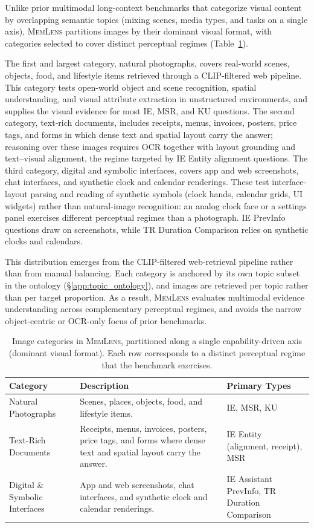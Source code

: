 \documentclass{article}
\newcommand{\bench}{\textsc{MemLens}}
\begin{document}
Unlike prior multimodal long-context benchmarks that categorize visual
content by overlapping semantic topics (mixing scenes, media types, and
tasks on a single axis), \bench{} partitions images by their dominant
visual format, with categories selected to cover distinct perceptual
regimes (Table~\ref{tab:image_categories}).

The first and largest category, natural photographs, covers real-world
scenes, objects, food, and lifestyle items retrieved through a
CLIP-filtered web pipeline. This category tests open-world object and
scene recognition, spatial understanding, and visual attribute extraction
in unstructured environments, and supplies the visual evidence for most
IE, MSR, and KU questions. The second category, text-rich documents,
includes receipts, menus, invoices, posters, price tags, and forms in
which dense text and spatial layout carry the answer; reasoning over these
images requires OCR together with layout grounding and text--visual
alignment, the regime targeted by IE Entity alignment questions. The third
category, digital and symbolic interfaces, covers app and web screenshots,
chat interfaces, and synthetic clock and calendar renderings. These test
interface-layout parsing and reading of synthetic symbols (clock hands,
calendar grids, UI widgets) rather than natural-image recognition: an
analog clock face or a settings panel exercises different perceptual
regimes than a photograph. IE PrevInfo questions draw on screenshots,
while TR Duration Comparison relies on synthetic clocks and calendars.

This distribution emerges from the CLIP-filtered web-retrieval pipeline
rather than from manual balancing. Each category is anchored by its own
topic subset in the ontology (\S\ref{app:topic_ontology}), and images are
retrieved per topic rather than per target proportion. As a result,
\bench{} evaluates multimodal evidence understanding across complementary
perceptual regimes, and avoids the narrow object-centric or OCR-only focus
of prior benchmarks.

\begin{table}[h]
\centering
\caption{Image categories in \bench{}, partitioned along a single capability-driven axis (dominant visual format). Each row corresponds to a distinct perceptual regime that the benchmark exercises.}
\label{tab:image_categories}
\small
\begin{tabularx}{\linewidth}{@{}l X l@{}}
\toprule
\textbf{Category} & \textbf{Description} & \textbf{Primary Types} \\
\midrule
Natural Photographs & Scenes, places, objects, food, and lifestyle items. & IE, MSR, KU \\
Text-Rich Documents & Receipts, menus, invoices, posters, price tags, and forms where dense text and spatial layout carry the answer. & IE Entity (alignment, receipt), MSR \\
Digital \& Symbolic Interfaces & App and web screenshots, chat interfaces, and synthetic clock and calendar renderings. & IE Assistant PrevInfo, TR Duration Comparison \\
\bottomrule
\end{tabularx}
\end{table}
\end{document}
